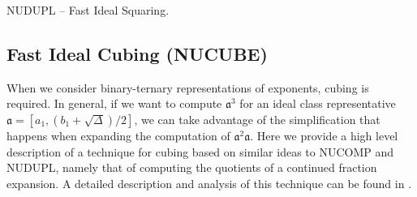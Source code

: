 \documentclass{ucalgthes1}
\theoremstyle{definition}
\newcommand{\algnewline}{\par\noindent\hskip\algorithmicindent}
\newcommand{\ZZ}{\mathbb{Z}}
\newcommand{\matrixtt}[4]{\left[ \begin{array}{rr} #1 & #2 \\ #3 & #4 \end{array} \right]}
\newcommand{\floor}[1]{\left\lfloor #1 \right\rfloor}
\begin{document}
\begin{algorithm}[htb]
\caption{NUDUPL -- Fast Ideal Squaring.}
\label{alg:nudupl}
\end{algorithm}

\subsection{Fast Ideal Cubing (NUCUBE)}
\label{subsec:nucube}

When we consider binary-ternary representations of exponents, cubing is required.  In general, if we want to compute ${\mathfrak a}^3$ for an ideal class representative $\mathfrak a = [a_1, (b_1+\sqrt\Delta)/2]$, we can take advantage of the simplification that happens when expanding the computation of ${\mathfrak a}^2 \mathfrak a$.  Here we provide a high level description of a technique for cubing based on similar ideas to NUCOMP and NUDUPL, namely that of computing the quotients of a continued fraction expansion.  A detailed description and analysis of this technique can be found in \cite{Imbert2010}.
\end{document}
